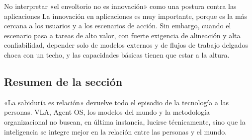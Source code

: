 \begin{warningbox}{No interpretar «el envoltorio no es innovación» como una postura contra las aplicaciones}
La innovación en aplicaciones es muy importante, porque es la más cercana a los usuarios y a los escenarios de acción. Sin embargo, cuando el escenario pasa a tareas de alto valor, con fuerte exigencia de alineación y alta confiabilidad, depender solo de modelos externos y de flujos de trabajo delgados choca con un techo, y las capacidades básicas tienen que estar a la altura.
\end{warningbox}

\subsection{Resumen de la sección}

«La sabiduría es relación» devuelve todo el episodio de la tecnología a las personas. VLA, Agent OS, los modelos del mundo y la metodología organizacional no buscan, en última instancia, lucirse técnicamente, sino que la inteligencia se integre mejor en la relación entre las personas y el mundo.
